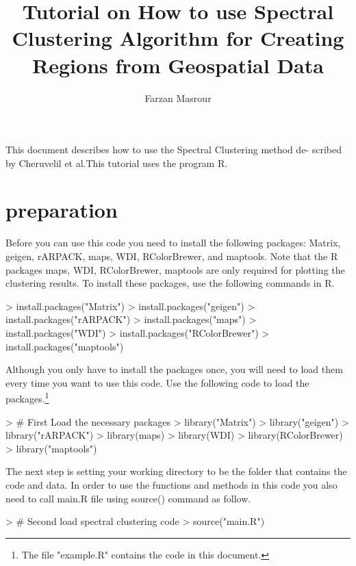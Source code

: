\documentclass{article}
\author{Farzan Masrour}
\title{Tutorial on How to use Spectral Clustering Algorithm for Creating Regions from Geospatial Data}
\begin{document}

\newcommand{\todo}[1] {{\textcolor{red}{\noindent ToDo: #1}\newline}}
\maketitle
This document describes how to use the Spectral Clustering method de- scribed by Cheruvelil et al.This tutorial uses the program {\color{blue}R}.

\section {preparation}
Before you can use this code you need to install the following packages: Matrix, geigen, rARPACK, maps, WDI, RColorBrewer, and maptools. Note that the R packages maps, WDI, RColorBrewer, maptools are only required for plotting the clustering results. To install these packages, use the following commands in R.
\begin{Schunk}
\begin{Sinput}
> install.packages("Matrix")
> install.packages("geigen")
> install.packages("rARPACK")
> install.packages("maps")
> install.packages("WDI")
> install.packages("RColorBrewer")
> install.packages("maptools")
\end{Sinput}
\end{Schunk}
Although you only have to install the packages once, you will need to load them every time you want to use this code. Use the following code to load the packages.\footnote{The file "example.R" contains the code in this document.}
\begin{Schunk}
\begin{Sinput}
> # First Load the necessary packages 
> library("Matrix")
> library("geigen")
> library("rARPACK")
> library(maps)
> library(WDI)
> library(RColorBrewer)
> library("maptools")
\end{Sinput}
\end{Schunk}
The next step is setting your working directory to be the folder that contains the code and data. In order to use the functions and methods in this code you also need to call main.R file using source() command as follow.

\begin{Schunk}
\begin{Sinput}
> # Second load spectral clustering code
> source("main.R")
\end{Sinput}
\end{Schunk}
\end{document}
